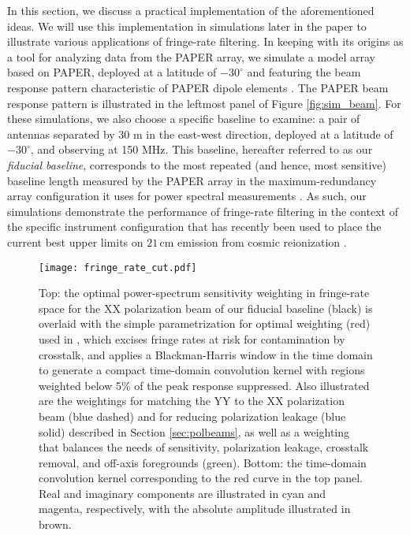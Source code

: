 \documentclass[twocolumn,apj,numberedappendix]{emulateapj}
\begin{document}
In this section, we discuss a practical implementation of the aforementioned ideas. We will use this implementation in simulations later in the paper to illustrate various applications of fringe-rate filtering. In 
keeping with its origins as a tool for analyzing data from the PAPER array, we simulate a model array based on PAPER, deployed at a latitude of $-30^\circ$
and featuring the beam response pattern characteristic of PAPER dipole elements \citep{parsons_et_al2008,pober_et_al2012}.
The PAPER beam response pattern is illustrated in the leftmost panel of Figure \ref{fig:sim_beam}.
For these simulations, we also choose a specific baseline to examine: a pair of antennas separated by 30 m in the 
east-west direction, deployed at a latitude of $-30^\circ$, and observing at 150 MHz.  This baseline, hereafter referred to as our {\it fiducial baseline}, 
corresponds to the most repeated (and hence,
most sensitive) baseline length measured by the PAPER array in the maximum-redundancy array configuration it uses
for power spectral measurements \citep{parsons_et_al2012a,P14,ali_et_al2015}.  As such, our simulations demonstrate the performance of fringe-rate filtering in the context of the specific instrument configuration
that has recently been used to place the current best upper limits on $21\,\textrm{cm}$ emission from cosmic reionization \citep{P14,J14,ali_et_al2015}.

\begin{figure}[!t]
\centering
\texttt{[image: fringe\_rate\_cut.pdf]}
\caption{
Top: the optimal power-spectrum sensitivity weighting in fringe-rate space 
for the XX polarization beam of our fiducial baseline (black) is overlaid with
the simple parametrization for optimal weighting (red) used in \citet{ali_et_al2015},
which excises fringe rates at risk for contamination by crosstalk, and 
applies a Blackman-Harris window in the time domain to
generate a compact time-domain convolution kernel with regions weighted below 5\% of the
peak response suppressed.
Also illustrated
are the weightings for matching the YY to the XX polarization beam (blue dashed) and
for reducing polarization leakage (blue solid) described in Section \ref{sec:polbeams}, as well
as a weighting that balances the needs of sensitivity, polarization leakage, crosstalk
removal, and off-axis foregrounds (green).  Bottom: the time-domain convolution kernel
corresponding to the red curve in the top panel.  Real and imaginary components are
illustrated in cyan and magenta, respectively, with the absolute amplitude illustrated
in brown.
}
\label{fig:fringe_rate_cut}
\end{figure}
\end{document}
